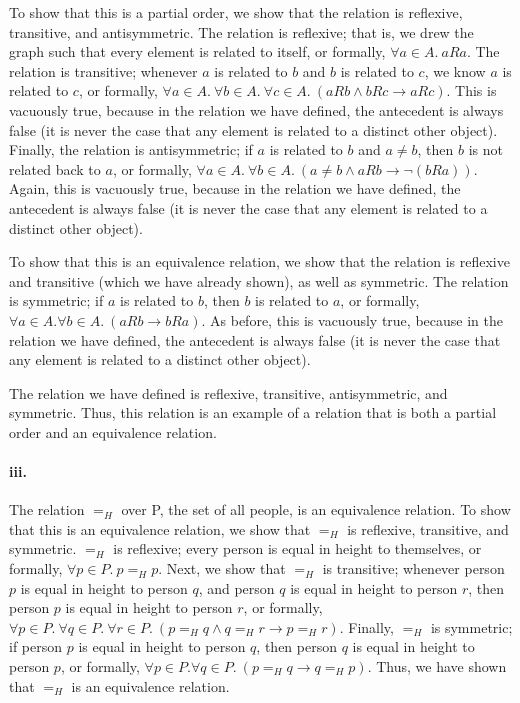 \documentclass[10pt,letter]{article}
\begin{document}
To show that this is a partial order, we show that the relation is reflexive, transitive, and antisymmetric. The relation is reflexive; that is, we drew the graph such that every element is related to itself, or formally, $\forall a \in A.\ aRa$. The relation is transitive; whenever $a$ is related to $b$ and $b$ is related to $c$, we know $a$ is related to $c$, or formally, $\forall a \in A.\ \forall b \in A.\ \forall c \in A.\ (aRb \wedge bRc \rightarrow aRc)$. This is vacuously true, because in the relation we have defined, the antecedent is always false (it is never the case that any element is related to a distinct other object). Finally, the relation is antisymmetric; if $a$ is related to $b$ and $a \neq b$, then $b$ is not related back to $a$, or formally, $\forall a \in A.\ \forall b \in A.\ (a \neq b \wedge aRb \rightarrow \neg(bRa))$. Again, this is vacuously true, because in the relation we have defined, the antecedent is always false (it is never the case that any element is related to a distinct other object).

To show that this is an equivalence relation, we show that the relation is reflexive and transitive (which we have already shown), as well as symmetric. The relation is symmetric; if $a$ is related to $b$, then $b$ is related to $a$, or formally, $\forall a \in A. \forall b \in A.\ (aRb \rightarrow bRa)$. As before, this is vacuously true, because in the relation we have defined, the antecedent is always false (it is never the case that any element is related to a distinct other object).  

The relation we have defined is reflexive, transitive, antisymmetric, and symmetric. Thus, this relation is an example of a relation that is both a partial order and an equivalence relation.

\paragraph{iii.} The relation $=_H$ over P, the set of all people, is an equivalence relation. To show that this is an equivalence relation, we show that $=_H$ is reflexive, transitive, and symmetric. $=_H$ is reflexive; every person is equal in height to themselves, or formally, $\forall p \in P.\ p =_H p$. Next, we show that $=_H$ is transitive; whenever person $p$ is equal in height to person $q$, and person $q$ is equal in height to person $r$, then person $p$ is equal in height to person $r$, or formally, $\forall p \in P.\ \forall q \in P.\ \forall r \in P.\ (p =_H q \wedge q =_H r \rightarrow p =_H r)$. Finally, $=_H$ is symmetric; if person $p$ is equal in height to person $q$, then person $q$ is equal in height to person $p$, or formally, $\forall p \in P. \forall q \in P.\ (p =_H q \rightarrow q =_H p)$. Thus, we have shown that $=_H$ is an equivalence relation.
\end{document}
